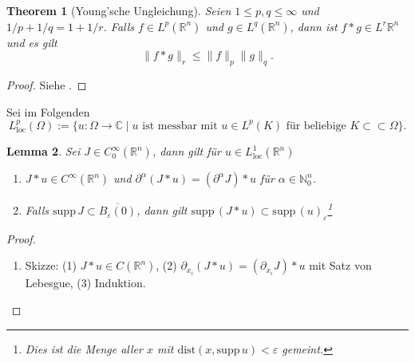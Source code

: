 \documentclass[
paper=a4,
bibtotocnumbered,
liststotocnumbered,
tablecaptionabove,
pointlessnumbers,
twoside,
openright,
10pt
]
{report}
\newcommand{\supp}{\mathrm{supp}\,}
\newcommand{\dist}{\mathrm{dist}}
\let\epsilon\varepsilon
\newtheorem{thm}{Theorem}[chapter]
\newtheorem{lem}[thm]{Lemma}
\theoremstyle{definition}
\numberwithin{equation}{chapter}
\begin{document}
\begin{thm}[Young'sche Ungleichung]\label{thm4}
Seien $1\leq p,q\leq\infty$ und $1/p+1/q=1+1/r$. Falls $f\in L^p(\mathbb{R}^n)$ und $g\in L^q(\mathbb{R}^n)$, dann ist $f\ast g\in L^r\mathbb{R}^n$ und es gilt
\begin{equation}
\|f\ast g\|_r\leq \|f\|_p\|g\|_q.
\end{equation}
\end{thm}
\begin{proof}
Siehe \cite{AF}.
\end{proof}

Sei im Folgenden
\begin{equation}
L_\mathrm{loc}^p(\Omega):=\{u:\Omega\rightarrow\mathbb{C}\mid u\text{ ist messbar mit }u\in L^p(K)\text{ für beliebige }K\subset\subset\Omega\}.
\end{equation}

\begin{lem}\label{lem5}
Sei $J\in C_0^\infty(\mathbb{R}^n)$, dann gilt für $u\in L_\mathrm{loc}^1(\mathbb{R}^n)$
\begin{enumerate}[\bf (a)]
\item $J\ast u\in C^\infty(\mathbb{R}^n)$ und $\partial^\alpha(J\ast u)=(\partial^\alpha J)\ast u$ für $\alpha\in\mathbb{N}_0^n$.
\item Falls $\supp J\subset \overline{B_\epsilon(0)}$, dann gilt $\supp (J\ast u)\subset\supp (u)_\epsilon$\footnote{Dies ist die Menge aller $x$ mit $\dist(x,\supp u) <\epsilon$ gemeint.}
\end{enumerate}
\end{lem}
\begin{proof}
\begin{enumerate}[\bf (a)]
\item Skizze: (1) $J\ast u\in C(\mathbb{R}^n)$, (2) $\partial_{x_i}(J\ast u)=(\partial_{x_i} J)\ast u$ mit Satz von Lebesgue, (3) Induktion.
\end{enumerate}
\end{proof}
\end{document}
